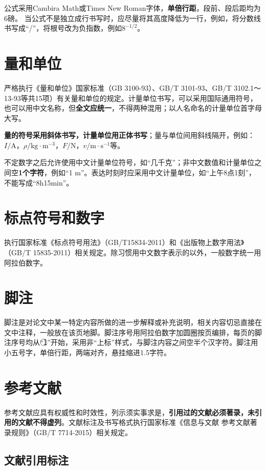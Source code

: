 公式采用Cambira Math或Times New Roman字体，\textbf{单倍行距}，段前、段后距均为6磅。
当公式不是独立成行书写时，应尽量将其高度降低为一行，例如，将分数线书写成“/”，将根号改为负指数，例如$8^{-1/2}$。

\section{量和单位}

严格执行《量和单位》国家标准（GB 3100-93）、GB/T 3101-93、GB/T 3102.1～13-93等共15项）有关量和单位的规定。计量单位书写，可以采用国际通用符号，也可以用中文名称，但\textbf{全文应统一}，不得两种混用；以人名命名的计量单位首字母大写。

\textbf{量的符号采用斜体书写，计量单位用正体书写}；量与单位间用斜线隔开，例如：$I/\mathrm{A}$，$\rho/\mathrm{kg \cdot m^{-3}}$，$F/\mathrm{N}$，$v/\mathrm{m \cdot s^{-1}}$等。

不定数字之后允许使用中文计量单位符号，如“几千克”；非中文数值和计量单位之间空\textbf{1个字符}，例如“1 m”。表达时刻时应采用中文计量单位，如“上午8点1刻”，不能写成“8h15min”。

\section{标点符号和数字}

执行国家标准《标点符号用法》（GB/T15834-2011）和《出版物上数字用法》（GB/T 15835-2011）相关规定。除习惯用中文数字表示的以外，一般数字统一用阿拉伯数字。

\section{脚注}

脚注是对论文中某一特定内容所做的进一步解释或补充说明，相关内容切忌直接在文中注释，一般放在该页地脚。脚注序号用阿拉伯数字加圆圈按页编排，每页的脚注序号均从“\textcircled{1}”开始，采用非“上标”样式，与脚注内容之间空半个汉字符。脚注用小五号字，单倍行距，两端对齐，悬挂缩进1.5字符。

\section{参考文献}\label{sec2.9}

参考文献应具有权威性和时效性，列示须实事求是，\textbf{引用过的文献必须著录，未引用的文献不得虚列}。文献标注及书写格式执行国家标准《信息与文献 参考文献著录规则》（GB/T 7714-2015）相关规定。

\subsection{文献引用标注}

